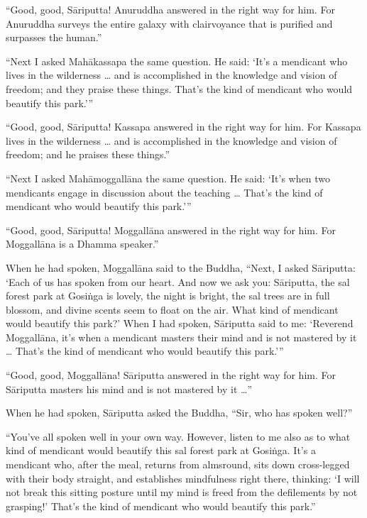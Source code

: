 \documentclass[12pt,openany]{book}%
\begin{document}
“Good, good, \textsanskrit{Sāriputta}! Anuruddha answered in the right way for him. For Anuruddha surveys the entire galaxy with clairvoyance that is purified and surpasses the human.” 

“Next I asked \textsanskrit{Mahākassapa} the same question. He said: ‘It’s a mendicant who lives in the wilderness … and is accomplished in the knowledge and vision of freedom; and they praise these things. That’s the kind of mendicant who would beautify this park.’” 

“Good, good, \textsanskrit{Sāriputta}! Kassapa answered in the right way for him. For Kassapa lives in the wilderness … and is accomplished in the knowledge and vision of freedom; and he praises these things.” 

“Next I asked \textsanskrit{Mahāmoggallāna} the same question. He said: ‘It’s when two mendicants engage in discussion about the teaching … That’s the kind of mendicant who would beautify this park.’” 

“Good, good, \textsanskrit{Sāriputta}! \textsanskrit{Moggallāna} answered in the right way for him. For \textsanskrit{Moggallāna} is a Dhamma speaker.” 

When he had spoken, \textsanskrit{Moggallāna} said to the Buddha, “Next, I asked \textsanskrit{Sāriputta}: ‘Each of us has spoken from our heart. And now we ask you: \textsanskrit{Sāriputta}, the sal forest park at \textsanskrit{Gosiṅga} is lovely, the night is bright, the sal trees are in full blossom, and divine scents seem to float on the air. What kind of mendicant would beautify this park?’ When I had spoken, \textsanskrit{Sāriputta} said to me: ‘Reverend \textsanskrit{Moggallāna}, it’s when a mendicant masters their mind and is not mastered by it … That’s the kind of mendicant who would beautify this park.’” 

“Good, good, \textsanskrit{Moggallāna}! \textsanskrit{Sāriputta} answered in the right way for him. For \textsanskrit{Sāriputta} masters his mind and is not mastered by it …” 

When he had spoken, \textsanskrit{Sāriputta} asked the Buddha, “Sir, who has spoken well?” 

“You’ve all spoken well in your own way. However, listen to me also as to what kind of mendicant would beautify this sal forest park at \textsanskrit{Gosiṅga}. It’s a mendicant who, after the meal, returns from almsround, sits down cross-legged with their body straight, and establishes mindfulness right there, thinking: ‘I will not break this sitting posture until my mind is freed from the defilements by not grasping!’ That’s the kind of mendicant who would beautify this park.” 
\end{document}
